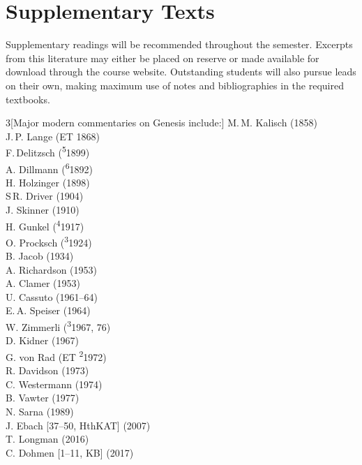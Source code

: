 \documentclass[titlepage]{article}
\begin{document}
\section{Supplementary Texts}
\label{supplementary}

Supplementary readings will be recommended throughout the semester.
Excerpts from this literature may either be placed on reserve or made
available for download through the course website. Outstanding students
will also pursue leads on their own, making maximum use of notes and
bibliographies in the required textbooks.

\begin{multicols}{3}[Major modern commentaries on Genesis include:]%
\footnotesize\noindent
M.\,M. Kalisch (1858)\\
J.\,P. Lange (ET 1868)\\
F.\,Delitzsch (\textsuperscript{5}1899)\\
A. Dillmann (\textsuperscript{6}1892)\\
H. Holzinger (1898)\\
S\,R. Driver (1904)\\
J. Skinner (1910)\\
H. Gunkel (\textsuperscript{4}1917)\\
O. Procksch (\textsuperscript{3}1924)\\
B. Jacob (1934)\\
A. Richardson (1953)\\
A. Clamer (1953)\\
U. Cassuto (1961--64)\\
E.\,A. Speiser (1964)\\
W. Zimmerli (\textsuperscript{3}1967, 76)\\
D. Kidner (1967)\\
G. von Rad (ET \textsuperscript{2}1972)\\
R. Davidson (1973)\\
C. Westermann (1974)\\
B. Vawter (1977)\\
N. Sarna (1989)\\
J. Ebach [37--50, HthKAT] (2007)\\
T. Longman (2016)\\
C. Dohmen [1--11, KB] (2017)
\end{multicols}
\end{document}
